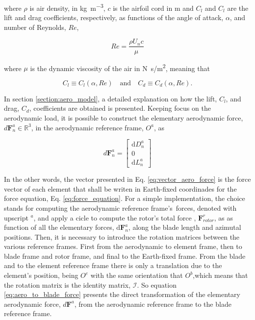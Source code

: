 \noindent where $\rho$ is air density, in \unit{\kg\per\meter^3}, $c$ is the airfoil cord in \unit{\meter} and $C_l$ and $C_l$ are the lift and drag coefficients, respectively, as functions of the angle of attack, $\alpha$, and number of Reynolds, $Re$,

\begin{equation}
    Re = \frac{\rho U_n c}{\mu}
    \label{eq:reynolds_number}
\end{equation}

\noindent where $\mu$ is the dynamic viscosity of the air in \unit{N s/m^2}, meaning that

\begin{equation}
    C_l \equiv C_l(\alpha, Re) \quad \text{and} \quad C_d\equiv C_d(\alpha, Re).
\end{equation}

In section \ref{section:aero_model}, a detailed explanation on how the lift, $C_l$, and drag, $C_d$, coefficients are obtained is presented. Keeping focus on the aerodynamic load, it is possible to construct the elementary aerodynamic force, $d\mathbf{F}^a_n \in \mathbb{R}^3$, in the aerodynamic reference frame, $O^a$, as

\begin{equation}
    d\mathbf{F}^a_n = \begin{bmatrix}
        \mathrm{d}D^a_n \\ 0 \\ \mathrm{d}L^a_n
    \end{bmatrix}
    \label{eq:vector_aero_force}
\end{equation}

In the other words, the vector presented in Eq. \ref{eq:vector_aero_force} is the force vector of each element that shall be writen in Earth-fixed coordinades for the force equation, Eq. \ref{eq:force_equation}. For a simple implementation, the choice stands for computing the aerodynamic reference frame's\ forces, denoted with upscript $^a$, and apply a cicle to compute the rotor's total force , $\mathbf{F}^r_{rotor}$, as as function of all the elementary forces, $\mathrm{d}\mathbf{F}^a_n$, along the blade length and azimutal positions. Then, it is necessary to introduce the rotation matrices between the various reference frames. First from the aerodynamic to element frame, then to blade frame and rotor frame, and final to the Earth-fixed frame. From the blade and to the element reference frame there is only a translation due to the element's position, being $O^e$ with the same orientation that $O^b$,which means that the rotation matrix is the identity matrix, $\boldsymbol{\mathcal{I}}$. So equation \ref{eq:aero_to_blade_force} presents the direct transformation of the elementary aerodynamic force, $d\mathbf{F}^a$, from the aerodynamic reference frame to the blade reference frame.

